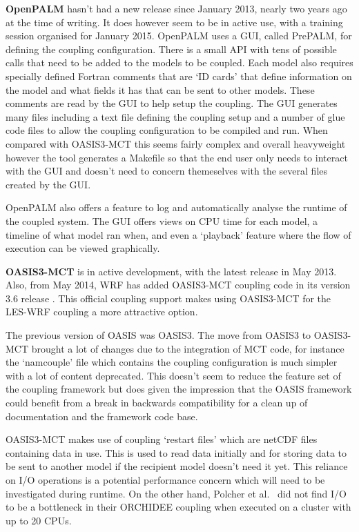 \documentclass{acm_proc_article-sp}
\renewcommand{\_}{\underscore\hspace{0pt}}
\begin{document}
\textbf{OpenPALM} hasn't had a new release since January 2013, nearly two years
ago at the time of writing. It does however seem to be in active use, with a
training session organised for January 2015. OpenPALM uses a GUI, called
PrePALM, for defining the coupling configuration. There is a small API with tens
of possible calls that need to be added to the models to be coupled. Each model
also requires specially defined Fortran comments that are `ID cards' that define
information on the model and what fields it has that can be sent to other
models. These comments are read by the GUI to help setup the coupling. The GUI
generates many files including a text file defining the coupling setup and a
number of glue code files to allow the coupling configuration to be compiled and
run. When compared with OASIS3-MCT this seems fairly complex and overall
heavyweight however the tool generates a Makefile so that the end user only
needs to interact with the GUI and doesn't need to concern themeselves with the
several files created by the GUI.

OpenPALM also offers a feature to log and automatically analyse the runtime of
the coupled system. The GUI offers views on CPU time for each model, a timeline
of what model ran when, and even a `playback' feature where the flow of
execution can be viewed graphically.

\textbf{OASIS3-MCT} is in active development, with the latest release in May
2013. Also, from May 2014, WRF has added OASIS3-MCT coupling code in its version
3.6 release \cite{ENES2014}. This official coupling support makes using
OASIS3-MCT for the LES-WRF coupling a more attractive option.

The previous version of OASIS was OASIS3. The move from OASIS3 to OASIS3-MCT
brought a lot of changes due to the integration of MCT code, for instance the
`namcouple' file which contains the coupling configuration is much simpler with
a lot of content deprecated. This doesn't seem to reduce the feature set of the
coupling framework but does given the impression that the OASIS framework could
benefit from a break in backwards compatibility for a clean up of documentation
and the framework code base.

OASIS3-MCT makes use of coupling `restart files' which are netCDF \cite{Unidata}
files containing data in use. This is used to read data initially and for
storing data to be sent to another model if the recipient model doesn't need it
yet. This reliance on I/O operations is a potential performance concern which
will need to be investigated during runtime. On the other hand, Polcher et al.\
\cite{Polcher2013} did not find I/O to be a bottleneck in their ORCHIDEE
coupling when executed on a cluster with up to 20 CPUs.
\end{document}
